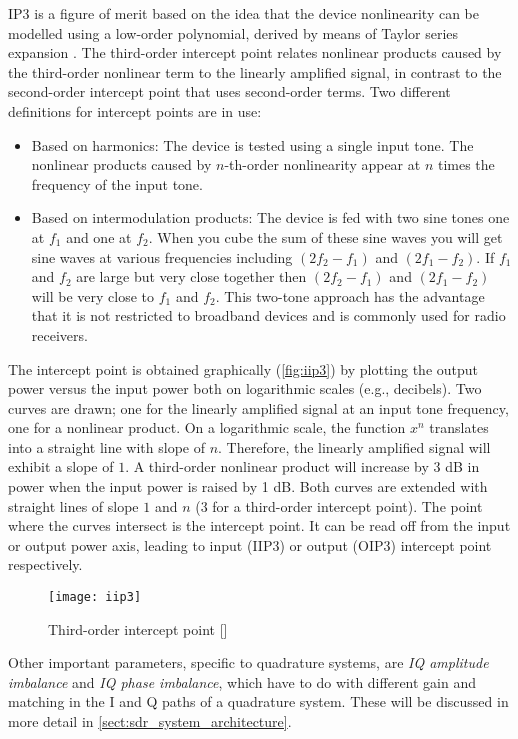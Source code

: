 IP3 is a figure of merit based on the idea that the device nonlinearity can be modelled using a low-order polynomial, derived by means of Taylor series expansion \cite{iip3}. The third-order intercept point relates nonlinear products caused by the third-order nonlinear term to the linearly amplified signal, in contrast to the second-order intercept point that uses second-order terms. Two different definitions for intercept points are in use:
\begin{itemize}
  \item Based on harmonics: The device is tested using a single input tone. The nonlinear products caused by $n$-th-order nonlinearity appear at $n$ times the frequency of the input tone.
  \item Based on intermodulation products: The device is fed with two sine tones one at $f_1$ and one at $f_2$.  When you cube the sum of these sine waves you will get sine waves at various frequencies including $(2f_2-f_1)$ and $(2f_1-f_2)$.  If $f_1$ and $f_2$ are large but very close together then $(2f_2-f_1)$ and $(2f_1-f_2)$ will be very close to $f_1$ and $f_2$. This two-tone approach has the advantage that it is not restricted to broadband devices and is commonly used for radio receivers.
\end{itemize}
The intercept point is obtained graphically (\autoref{fig:iip3}) by plotting the output power versus the input power both on logarithmic scales (e.g., decibels). Two curves are drawn; one for the linearly amplified signal at an input tone frequency, one for a nonlinear product. On a logarithmic scale, the function $x^n$ translates into a straight line with slope of $n$. Therefore, the linearly amplified signal will exhibit a slope of $1$. A third-order nonlinear product will increase by 3 dB in power when the input power is raised by 1 dB. Both curves are extended with straight lines of slope $1$ and $n$ ($3$ for a third-order intercept point). The point where the curves intersect is the intercept point. It can be read off from the input or output power axis, leading to input (IIP3) or output (OIP3) intercept point respectively.

\begin{figure}[H]
  \centering
  \texttt{[image: iip3]}
  \caption{Third-order intercept point [\citeauthor{iip3}]}
  \label{fig:iip3}
\end{figure}

Other important parameters, specific to quadrature systems, are \emph{IQ amplitude imbalance} and \emph{IQ phase imbalance}, which have to do with different gain and matching in the I and Q paths of a quadrature system. These will be discussed in more detail in \autoref{sect:sdr_system_architecture}.


